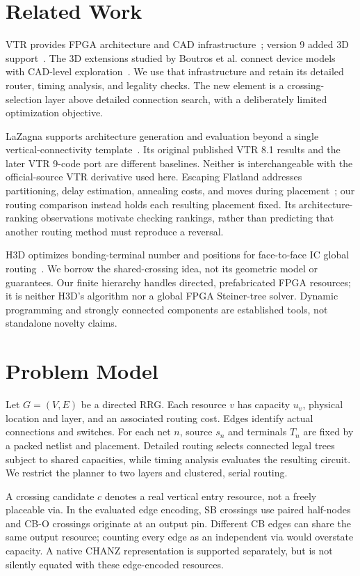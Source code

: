 \documentclass[conference,10pt]{IEEEtran}
\begin{document}
\section{Related Work}
VTR provides FPGA architecture and CAD infrastructure~\cite{vtr8}; version 9 added 3D support~\cite{vtr9}. The 3D extensions studied by Boutros et al. connect device models with CAD-level exploration~\cite{third}. We use that infrastructure and retain its detailed router, timing analysis, and legality checks. The new element is a crossing-selection layer above detailed connection search, with a deliberately limited optimization objective.

LaZagna supports architecture generation and evaluation beyond a single vertical-connectivity template~\cite{lazagna}. Its original published VTR 8.1 results and the later VTR 9-code port are different baselines. Neither is interchangeable with the official-source VTR derivative used here. Escaping Flatland addresses partitioning, delay estimation, annealing costs, and moves during placement~\cite{flatland}; our routing comparison instead holds each resulting placement fixed. Its architecture-ranking observations motivate checking rankings, rather than predicting that another routing method must reproduce a reversal.

H3D optimizes bonding-terminal number and positions for face-to-face IC global routing~\cite{h3d}. We borrow the shared-crossing idea, not its geometric model or guarantees. Our finite hierarchy handles directed, prefabricated FPGA resources; it is neither H3D's algorithm nor a global FPGA Steiner-tree solver. Dynamic programming and strongly connected components are established tools, not standalone novelty claims.

\clearpage
\section{Problem Model}
Let $G=(V,E)$ be a directed RRG. Each resource $v$ has capacity $u_v$, physical location and layer, and an associated routing cost. Edges identify actual connections and switches. For each net $n$, source $s_n$ and terminals $T_n$ are fixed by a packed netlist and placement. Detailed routing selects connected legal trees subject to shared capacities, while timing analysis evaluates the resulting circuit. We restrict the planner to two layers and clustered, serial routing.

A crossing candidate $c$ denotes a real vertical entry resource, not a freely placeable via. In the evaluated edge encoding, SB crossings use paired half-nodes and CB-O crossings originate at an output pin. Different CB edges can share the same output resource; counting every edge as an independent via would overstate capacity. A native CHANZ representation is supported separately, but is not silently equated with these edge-encoded resources.
\end{document}
